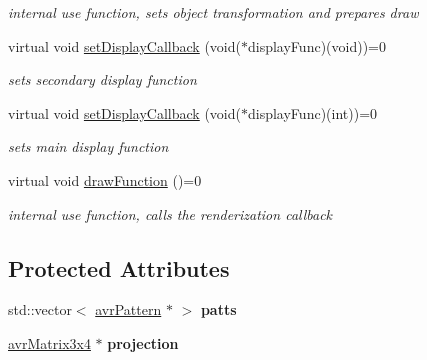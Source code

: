 \begin{DoxyCompactItemize}
\begin{DoxyCompactList}\small\item\em internal use function, sets object transformation and prepares draw \end{DoxyCompactList}\item 
\hypertarget{classavr_system_marker_a5a01bf7952c90ebf4234d86a93c1a261}{virtual void \hyperlink{classavr_system_marker_a5a01bf7952c90ebf4234d86a93c1a261}{set\-Display\-Callback} (void($\ast$display\-Func)(void))=0}\label{classavr_system_marker_a5a01bf7952c90ebf4234d86a93c1a261}

\begin{DoxyCompactList}\small\item\em sets secondary display function \end{DoxyCompactList}\item 
\hypertarget{classavr_system_marker_a89b996f137d45d3cd2f1adfa6cfebc34}{virtual void \hyperlink{classavr_system_marker_a89b996f137d45d3cd2f1adfa6cfebc34}{set\-Display\-Callback} (void($\ast$display\-Func)(int))=0}\label{classavr_system_marker_a89b996f137d45d3cd2f1adfa6cfebc34}

\begin{DoxyCompactList}\small\item\em sets main display function \end{DoxyCompactList}\item 
\hypertarget{classavr_system_marker_ab237ef95b8a5ab8244074e359382674b}{virtual void \hyperlink{classavr_system_marker_ab237ef95b8a5ab8244074e359382674b}{draw\-Function} ()=0}\label{classavr_system_marker_ab237ef95b8a5ab8244074e359382674b}

\begin{DoxyCompactList}\small\item\em internal use function, calls the renderization callback \end{DoxyCompactList}\end{DoxyCompactItemize}
\subsection*{Protected Attributes}
\begin{DoxyCompactItemize}
\item 
\hypertarget{classavr_system_marker_a979bc77ea440bbdf9fe5737164925450}{std\-::vector$<$ \hyperlink{classavr_pattern}{avr\-Pattern} $\ast$ $>$ {\bfseries patts}}\label{classavr_system_marker_a979bc77ea440bbdf9fe5737164925450}

\item 
\hypertarget{classavr_system_marker_a5e7a6a94a0286fc7b60af9e961dc73a7}{\hyperlink{classavr_matrix3x4}{avr\-Matrix3x4} $\ast$ {\bfseries projection}}\label{classavr_system_marker_a5e7a6a94a0286fc7b60af9e961dc73a7}

\end{DoxyCompactItemize}


